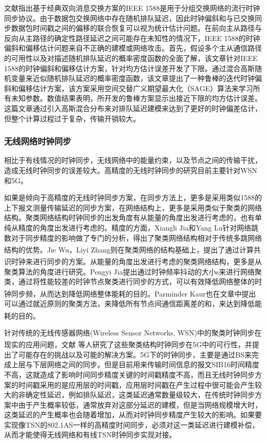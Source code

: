 \documentclass[UTF8,a4paper,12pt]{ctexart}
\numberwithin{equation}{section}
\begin{document}
	
	文献\cite{karthik2020robust}指出基于经典双向消息交换方案的IEEE 1588是用于分组交换网络的流行时钟同步协议。由于数据包交换网络中存在随机排队延迟，因此时钟偏斜和与已交换同步数据包时间戳之间的偏移的联合恢复可以视为统计估计问题。在前向主从路径与反向从主路径的确定性路径延迟之间可能存在未知性的情况下，IEEE 1588的时钟偏斜和偏移估计问题来自不正确的建模或网络攻击。首先，假设多个主从通信路径的可用性以及对描述随机排队延迟的概率密度函数的全面了解，该文章针对IEEE 1588的时钟偏斜和偏移估计方案，针对均方估计误差开发了下限。通过混合高斯随机变量来近似随机排队延迟的概率密度函数，该文章提出了一种鲁棒的迭代时钟偏斜和偏移估计方案，该方案采用空间交替广义期望最大化（SAGE）算法来学习所有未知参数。数值结果表明，所开发的鲁棒方案显示出接近下限的均方估计误差。这篇文章通过引入高斯混合分布来对排队延迟建模来达到了更好的时钟偏差估计，但整个计算过程过于复杂，传输开销较大。
	
	\subsubsection{无线网络时钟同步}
	
	相比于有线情况的时钟同步，无线网络中的能量约束，以及节点之间的传输干扰，造成无线时钟同步的误差较大。高精度的无线时钟同步的研究目前主要针对WSN和5G。
	
	如果是倾向于高精度的无线时钟同步方案，在同步方法上，更多是采用类似1588的上下报文测量传输延迟的同步方案，在网络结构上，更多是采用类似于聚类的网络结构。聚类网络结构时钟同步的出发角度有从能量的角度出发进行考虑的，也有单纯从精度的角度出发进行考虑的。精度的方面，Xiangli Jia和Yang Lu针对网络跳数对于同步精度的影响做了专门的分析，得出了聚类网络结构相对于传统多跳网络结构的优势\textsuperscript{\cite{jia2019improved}}。Jie Wu，Liyi Zhang则在聚类网络的结构基础上，提出了通过计算共识时钟来进行同步的方案\textsuperscript{\cite{wu2014cluster}}。从能量的角度出发进行考虑的聚类网络结构，更多是从聚类算法的角度进行研究。Pengyi Jia提出通过时钟频率抖动的大小s来进行网络聚类，通过将性能较差的时钟节点聚类进行同步的方式，可以有效降低网络整体的时钟同步频，从而达到降低网络整体能耗的目的\textsuperscript{\cite{jia2019distributed}}。Parminder Kaur也在文章中提出可以通过就近原则的聚类方法，来降低所有节点间通信距离差的和，来达到降低能耗的目的\textsuperscript{\cite{kaur2015energy}}。
	
	
	针对传统的无线传感器网络(Wireless Sensor Networks, WSN)中的聚类时钟同步在现实的应用问题，文献\textsuperscript{\cite{lee2011accuracy}}  等人研究了这些聚类结构时钟同步在5G中的可行性，并提出了可能存在的挑战以及可能的解决方案。5G下的时钟同步，主要是通过BS来完成上层与下层网络之间的同步。但是目前用来传输时间信息的报文SIB16时间精度不高，这就造成了影响时间同步精度关键的时间戳精度不高，而且无线时钟同步方案的时间戳采用的是应用层的时间戳，应用层时间戳在产生过程中很可能会产生较大的非确定性延迟，例如排队延迟，这类延迟通常数量级较大，在传统时钟同步方案中由于产生概率较低，通常放弃对这部分延迟的建模，但是当网络规模增大时，这类延迟的产生概率也会随着增加，从而对时钟同步精度产生较大的影响。如果要实现像TSN的802.1AS一样的高精度时间同步，必须对这一类延迟进行建模补偿，从而才能使得无线网络和有线TSN时钟同步实现对接。
	
\end{document}

